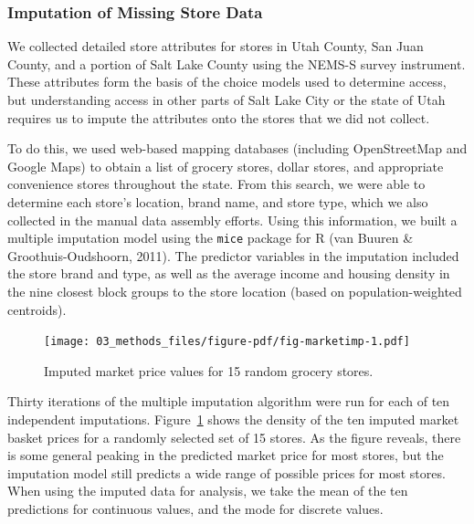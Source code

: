 \documentclass[
  letterpaper,
  authoryear,
  review,
  3p]{elsarticle}
\begin{document}
\hypertarget{imputation-of-missing-store-data}{%
\subsubsection{Imputation of Missing Store
Data}\label{imputation-of-missing-store-data}}

We collected detailed store attributes for stores in Utah County, San
Juan County, and a portion of Salt Lake County using the NEMS-S survey
instrument. These attributes form the basis of the choice models used to
determine access, but understanding access in other parts of Salt Lake
City or the state of Utah requires us to impute the attributes onto the
stores that we did not collect.

To do this, we used web-based mapping databases (including OpenStreetMap
and Google Maps) to obtain a list of grocery stores, dollar stores, and
appropriate convenience stores throughout the state. From this search,
we were able to determine each store's location, brand name, and store
type, which we also collected in the manual data assembly efforts. Using
this information, we built a multiple imputation model using the
\texttt{mice} package for R (van Buuren \& Groothuis-Oudshoorn, 2011).
The predictor variables in the imputation included the store brand and
type, as well as the average income and housing density in the nine
closest block groups to the store location (based on population-weighted
centroids).

\begin{figure}

{\centering \texttt{[image: 03\_methods\_files/figure-pdf/fig-marketimp-1.pdf]}

}

\caption{\label{fig-marketimp}Imputed market price values for 15 random
grocery stores.}

\end{figure}

Thirty iterations of the multiple imputation algorithm were run for each
of ten independent imputations. Figure~\ref{fig-marketimp} shows the
density of the ten imputed market basket prices for a randomly selected
set of 15 stores. As the figure reveals, there is some general peaking
in the predicted market price for most stores, but the imputation model
still predicts a wide range of possible prices for most stores. When
using the imputed data for analysis, we take the mean of the ten
predictions for continuous values, and the mode for discrete values.
\end{document}
